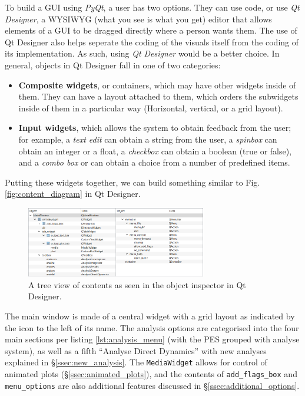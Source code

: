 \documentclass[12pt]{article}
\begin{document}
To build a GUI using \textit{PyQt}, a user has two options. They can use code, or use \textit{Qt Designer}, a WYSIWYG (what you see is what you get) editor that allows elements of a GUI to be dragged directly where a person wants them. The use of Qt Designer also helps seperate the coding of the visuals itself from the coding of its implementation. As such, using \textit{Qt Designer} would be a better choice. In general, objects in Qt Designer fall in one of two categories:
\begin{itemize}
    \item \textbf{Composite widgets}, or containers, which may have other widgets inside of them. They can have a layout attached to them, which orders the subwidgets inside of them in a particular way (Horizontal, vertical, or a grid layout).
    \item \textbf{Input widgets}, which allows the system to obtain feedback from the user; for example, a \textit{text edit} can obtain a string from the user, a \textit{spinbox} can obtain an integer or a float, a \textit{checkbox} can obtain a boolean (true or false), and a \textit{combo box} or can obtain a choice from a number of predefined items.
\end{itemize}

Putting these widgets together, we can build something similar to Fig. \ref{fig:content_diagram} in Qt Designer.

\begin{figure}[h]
    \centering
    \includegraphics[width=0.7\textwidth]{img/content_diagram_designer.png}
    \caption{A tree view of contents as seen in the object inspector in Qt Designer.}
    \label{fig:content_diagram_designer}
\end{figure}

The main window is made of a central widget with a grid layout as indicated by the icon to the left of its name. The analysis options are categorised into the four main sections per listing \ref{lst:analysis_menu} (with the PES grouped with analyse system), as well as a fifth ``Analyse Direct Dynamics'' with new analyses explained in \S\ref{ssec:new_analysis}. The \texttt{MediaWidget} allows for control of animated plots (\S\ref{ssec:animated_plots}), and the contents of \texttt{add\_flags\_box} and \texttt{menu\_options} are also additional features discussed in \S\ref{ssec:additional_options}.
\end{document}
